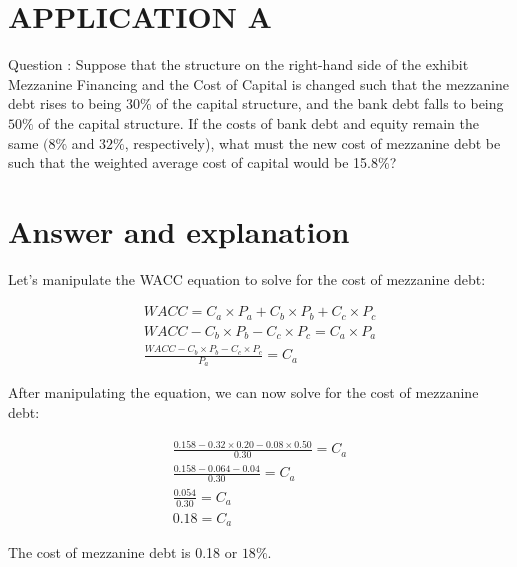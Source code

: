 \documentclass[11pt]{article}
\begin{document}
\section*{APPLICATION A}
Question : Suppose that the structure on the right-hand side of the exhibit Mezzanine Financing and the Cost of Capital is changed such that the mezzanine debt rises to being $30 \%$ of the capital structure, and the bank debt falls to being $50 \%$ of the capital structure. If the costs of bank debt and equity remain the same $(8 \%$ and $32 \%$, respectively), what must the new cost of mezzanine debt be such that the weighted average cost of capital would be 15.8\%?

\section*{Answer and explanation}
Let's manipulate the WACC equation to solve for the cost of mezzanine debt:

$$
\begin{gathered}
W A C C=C_{a} \times P_{a}+C_{b} \times P_{b}+C_{c} \times P_{c} \\
W A C C-C_{b} \times P_{b}-C_{c} \times P_{c}=C_{a} \times P_{a} \\
\frac{W A C C-C_{b} \times P_{b}-C_{c} \times P_{c}}{P_{a}}=C_{a}
\end{gathered}
$$

After manipulating the equation, we can now solve for the cost of mezzanine debt:

$$
\begin{gathered}
\frac{0.158-0.32 \times 0.20-0.08 \times 0.50}{0.30}=C_{a} \\
\frac{0.158-0.064-0.04}{0.30}=C_{a} \\
\frac{0.054}{0.30}=C_{a} \\
0.18=C_{a}
\end{gathered}
$$

The cost of mezzanine debt is 0.18 or $18 \%$.
\end{document}
